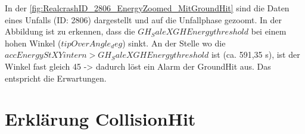 In der \autoref{fig:RealcrashID_2806_EnergyZoomed_MitGroundHit} sind die Daten eines Unfalls (ID: 2806) dargestellt und auf die Unfallphase gezoomt. In der Abbildung ist zu erkennen, dass die $GH_SaleXGHEnergythreshold$ bei einem hohen Winkel ($tipOverAngle_deg$) sinkt. An der Stelle wo die $accEnergyStXYintern > GH_SaleXGHEnergythreshold$ ist (ca. 591,35 s), ist der Winkel fast gleich 45 -> dadurch löst ein Alarm der GroundHit aus. Das entspricht die Erwartungen.




\section{Erklärung CollisionHit}
%
%
%
%

%
%
%
%





















%
%
%
%
%
%
%
%
%
%

